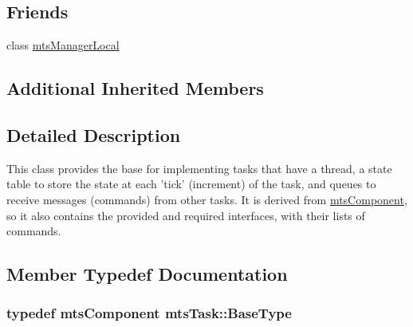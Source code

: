 \subsection*{Friends}
\begin{DoxyCompactItemize}
\item 
class \hyperlink{classmts_task_a31c1c611dbb103ac58ed40d84960baa0}{mts\-Manager\-Local}
\end{DoxyCompactItemize}
\subsection*{Additional Inherited Members}


\subsection{Detailed Description}
This class provides the base for implementing tasks that have a thread, a state table to store the state at each 'tick' (increment) of the task, and queues to receive messages (commands) from other tasks. It is derived from \hyperlink{classmts_component}{mts\-Component}, so it also contains the provided and required interfaces, with their lists of commands. 

\subsection{Member Typedef Documentation}
\hypertarget{classmts_task_aac1f3b293b0dc04205b449899c795b80}{
\subsubsection[{Base\-Type}]{\setlength{\rightskip}{0pt plus 5cm}typedef {\bf mts\-Component} {\bf mts\-Task\-::\-Base\-Type}}}\label{classmts_task_aac1f3b293b0dc04205b449899c795b80}


